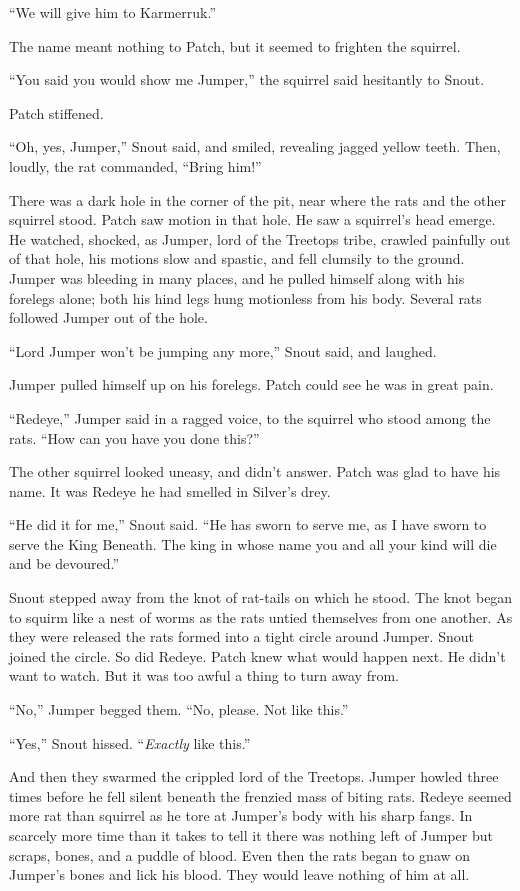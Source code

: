\documentclass[ebook,oneside,openany,17pt]{memoir}
\begin{document}
“We will give him to Karmerruk.”

The name meant nothing to Patch, but it seemed to frighten the
squirrel.

“You said you would show me Jumper,” the squirrel said hesitantly to
Snout.

Patch stiffened.

“Oh, yes, Jumper,” Snout said, and smiled, revealing jagged yellow
teeth. Then, loudly, the rat commanded, “Bring him!”

There was a dark hole in the corner of the pit, near where the rats
and the other squirrel stood. Patch saw motion in that hole. He saw a
squirrel’s head emerge. He watched, shocked, as Jumper, lord of the
Treetops tribe, crawled painfully out of that hole, his motions slow
and spastic, and fell clumsily to the ground. Jumper was bleeding in
many places, and he pulled himself along with his forelegs alone; both
his hind legs hung motionless from his body. Several rats followed
Jumper out of the hole.

“Lord Jumper won’t be jumping any more,” Snout said, and laughed.

Jumper pulled himself up on his forelegs. Patch could see he was in
great pain.

“Redeye,” Jumper said in a ragged voice, to the squirrel who stood
among the rats. “How can you have you done this?”

The other squirrel looked uneasy, and didn’t answer. Patch was glad to
have his name. It was Redeye he had smelled in Silver’s drey.

“He did it for me,” Snout said. “He has sworn to serve me, as I have
sworn to serve the King Beneath. The king in whose name you and all
your kind will die and be devoured.”

Snout stepped away from the knot of rat-tails on which he stood. The
knot began to squirm like a nest of worms as the rats untied
themselves from one another. As they were released the rats formed
into a tight circle around Jumper. Snout joined the circle. So did
Redeye. Patch knew what would happen next. He didn’t want to
watch. But it was too awful a thing to turn away from.

“No,” Jumper begged them. “No, please. Not like this.”

“Yes,” Snout hissed. “\emph{Exactly} like this.”

And then they swarmed the crippled lord of the Treetops. Jumper howled
three times before he fell silent beneath the frenzied mass of biting
rats. Redeye seemed more rat than squirrel as he tore at Jumper’s body
with his sharp fangs. In scarcely more time than it takes to tell it
there was nothing left of Jumper but scraps, bones, and a puddle of
blood. Even then the rats began to gnaw on Jumper’s bones and lick his
blood. They would leave nothing of him at all.
\end{document}

